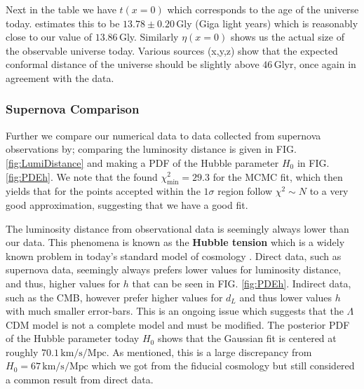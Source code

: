 \documentclass[%
reprint,
 amsmath,amssymb,
 aps,
]{revtex4-2}
\begin{document}
Next in the table we have $t(x=0)$ which corresponds to the age of the universe today. \cite{1} estimates this to be $13.78\pm0.20\,$Gly (Giga light years) which is reasonably close to our value of $13.86\,$Gly. Similarly $\eta(x=0)$ shows us the actual size of the observable universe today. Various sources (x,y,z) show that the expected conformal distance of the universe should be slightly above $46\,$Glyr, once again in agreement with the data. 
\subsubsection{Supernova Comparison}
Further we compare our numerical data to data collected from supernova observations \cite[Betoule et al. 2014]{SDSS:2014iwm} by; comparing the luminosity distance is given in FIG. \ref{fig:LumiDistance} and making a PDF of the Hubble parameter $H_0$ in FIG. \ref{fig:PDEh}. We note that the found $\chi^2_\text{min}=29.3$ for the MCMC fit, which then yields that for the points accepted within the $1\sigma$ region follow $\chi^2\sim N$ to a very good approximation, suggesting that we have a good fit. 

The luminosity distance from observational data is seemingly always lower than our data. This phenomena is known as the \textbf{Hubble tension} which is a widely known problem in today's standard model of cosmology \cite{Di_Valentino_2021}. Direct data, such as supernova data, seemingly always prefers lower values for luminosity distance, and thus, higher values for $h$ that can be seen in FIG. \ref{fig:PDEh}. Indirect data, such as the CMB, however prefer higher values for $d_L$ and thus lower values $h$ with much smaller error-bars. This is an ongoing issue which suggests that the $\Lambda$CDM model is not a complete model and must be modified. The posterior PDF of the Hubble parameter today $H_0$ shows that the Gaussian fit is centered at roughly $70.1\,\text{km/s/Mpc}$. As mentioned, this is a large discrepancy from $H_0=67\,\text{km/s/Mpc}$ which we got from the fiducial cosmology but still considered a common result from direct data. 
\end{document}
